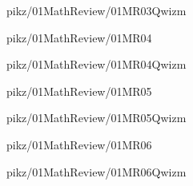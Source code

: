 \documentclass[9pt,xcolor={svgnames, x11names}]{beamer}
\begin{document}

\begin{frame}{pikz/01MathReview/01MR03Qwizm}
  
\end{frame}


\begin{frame}{pikz/01MathReview/01MR04}
  \resizebox{0.5\textwidth}{!}{%
    
  }
\end{frame}


\begin{frame}{pikz/01MathReview/01MR04Qwizm}
  
\end{frame}


\begin{frame}{pikz/01MathReview/01MR05}
  
\end{frame}


\begin{frame}{pikz/01MathReview/01MR05Qwizm}
  
\end{frame}


\begin{frame}{pikz/01MathReview/01MR06}
  
\end{frame}


\begin{frame}{pikz/01MathReview/01MR06Qwizm}
  
\end{frame}


\end{document}
